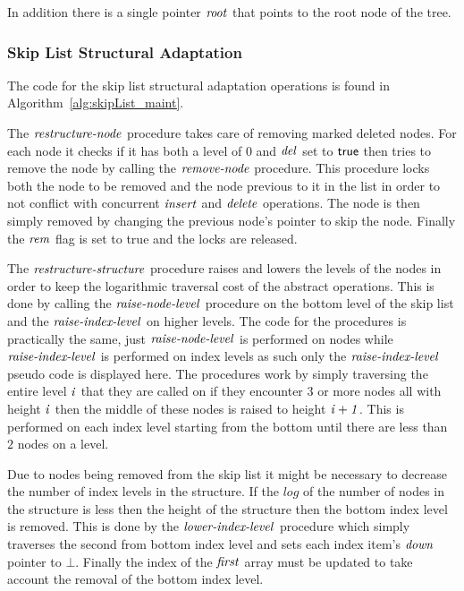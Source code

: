 In addition there is a single pointer $\ms{root}$ that points to the root node of
the tree.

\subsubsection{Skip List Structural Adaptation}



The code for the skip list structural adaptation operations is found in Algorithm~\ref{alg:skipList_maint}.

The $\ms{restructure-node}$ procedure takes care of removing marked deleted nodes.
For each node it checks if it has both a level of $0$ and $\ms{del}$ set to $\lit{true}$
then tries to remove the node by calling the $\ms{remove-node}$ procedure.
This procedure locks both the node to be removed and the node previous to it in the list in order
to not conflict with concurrent $\ms{insert}$ and $\ms{delete}$ operations.
The node is then simply removed by changing the previous node's pointer to skip the node.
Finally the $\ms{rem}$ flag is set to true and the locks are released.

The $\ms{restructure-structure}$ procedure raises and lowers the levels of the nodes in order
to keep the logarithmic traversal cost of the abstract operations.
This is done by calling the $\ms{raise-node-level}$ procedure on the bottom level of the
skip list and the $\ms{raise-index-level}$ on higher levels.
The code for the procedures is practically the same, just $\ms{raise-node-level}$ is performed
on nodes while $\ms{raise-index-level}$ is performed on index levels as such only the 
$\ms{raise-index-level}$ pseudo code is displayed here.
The procedures work by simply traversing the entire level $\ms{i}$ that they are called on
if they encounter $3$ or more nodes all with height $\ms{i}$ then the middle of these
nodes is raised to height $\ms{i+1}$.
This is performed on each index level starting from the bottom until there are less than $2$
nodes on a level.

Due to nodes being removed from the skip list it might be necessary to decrease
the number of index levels in the structure.
If the $log$ of the number of nodes in the structure is less then the height of
the structure then the bottom index level is removed.
This is done by the $\ms{lower-index-level}$ procedure which simply traverses
the second from bottom index level and sets each index item's $\ms{down}$ pointer to $\bot$.
Finally the index of the $\ms{first}$ array must be updated to take account
the removal of the bottom index level.

